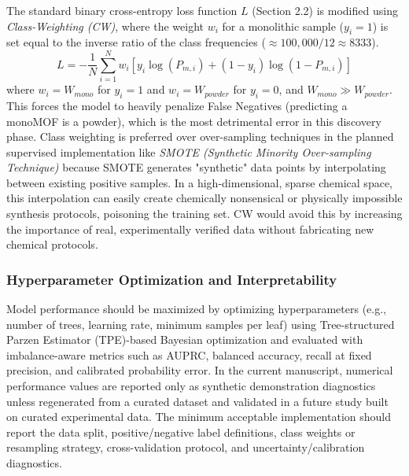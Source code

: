 \documentclass[12pt,a4paper]{article}
\begin{document}
The standard binary cross-entropy loss function $L$ (Section 2.2) is modified using \textit{Class-Weighting (CW)}, where the weight $w_{i}$ for a monolithic sample ($y_i=1$) is set equal to the inverse ratio of the class frequencies ($\approx 100,000 / 12 \approx 8333$).
\[
L = -\frac{1}{N} \sum_{i=1}^N w_i \left[y_i \log(P_{m,i}) + (1-y_i) \log(1-P_{m,i})\right]
\]
where $w_i = W_{mono}$ for $y_i=1$ and $w_i = W_{powder}$ for $y_i=0$, and $W_{mono} \gg W_{powder}$. This forces the model to heavily penalize False Negatives (predicting a monoMOF is a powder), which is the most detrimental error in this discovery phase. Class weighting is preferred over over-sampling techniques in the planned supervised implementation like \textit{SMOTE (Synthetic Minority Over-sampling Technique)} because SMOTE generates "synthetic" data points by interpolating between existing positive samples. In a high-dimensional, sparse chemical space, this interpolation can easily create chemically nonsensical or physically impossible synthesis protocols, poisoning the training set. CW would avoid this by increasing the importance of real, experimentally verified data without fabricating new chemical protocols.

\subsubsection{Hyperparameter Optimization and Interpretability}

Model performance should be maximized by optimizing hyperparameters (e.g., number of trees, learning rate, minimum samples per leaf) using Tree-structured Parzen Estimator (TPE)-based Bayesian optimization and evaluated with imbalance-aware metrics such as AUPRC, balanced accuracy, recall at fixed precision, and calibrated probability error. In the current manuscript, numerical performance values are reported only as synthetic demonstration diagnostics unless regenerated from a curated dataset and validated in a future study built on curated experimental data. The minimum acceptable implementation should report the data split, positive/negative label definitions, class weights or resampling strategy, cross-validation protocol, and uncertainty/calibration diagnostics.
\end{document}
